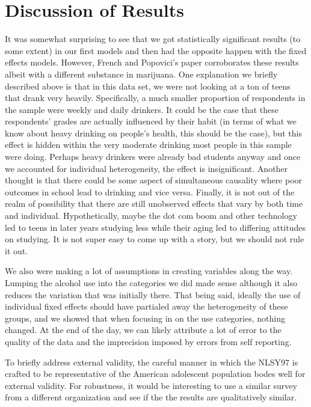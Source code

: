 \documentclass[11pt]{article}
\begin{document}


\section*{Discussion of Results}

It was somewhat surprising to see that we got statistically significant results (to some extent) in our first models and then had the opposite happen with the fixed effects models. However, French and Popovici's paper corroborates these results albeit with a different substance in marijuana. One explanation we briefly described above is that in this data set, we were not looking at a ton of teens that drank very heavily. Specifically, a much smaller proportion of respondents in the sample were weekly and daily drinkers. It could be the case that these respondents' grades are actually influenced by their habit (in terms of what we know about heavy drinking on people's health, this should be the case), but this effect is hidden within the very moderate drinking most people in this sample were doing. Perhaps heavy drinkers were already bad students anyway and once we accounted for individual heterogeneity, the effect is insignificant. Another thought is that there could be some aspect of simultaneous causality where poor outcomes in school lead to drinking and vice versa. Finally, it is not out of the realm of possibility that there are still unobserved effects that vary by both time and individual. Hypothetically, maybe the dot com boom and other technology led to teens in later years studying less while their aging led to differing attitudes on studying. It is not super easy to come up with a story, but we should not rule it out. 

We also were making a lot of assumptions in creating variables along the way. Lumping the alcohol use into the categories we did made sense although it also reduces the variation that was initially there. That being said, ideally the use of individual fixed effects should have partialed away the heterogeneity of these groups, and we showed that when focusing in on the use categories, nothing changed. At the end of the day, we can likely attribute a lot of error to the quality of the data and the imprecision imposed by errors from self reporting. 

To briefly address external validity, the careful manner in which the NLSY97 is crafted to be representative of the American adolescent population bodes well for external validity. For robustness, it would be interesting to use a similar survey from a different organization and see if the the results are qualitatively similar. 
\end{document}
